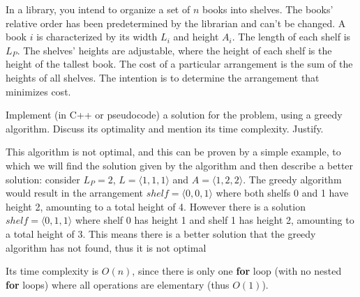 {
\renewcommand{\thechapter}{\arabic{chapter}N}
\setcounter{chapter}{16}

In a library, you intend to organize a set of $n$ books into shelves. The books' relative order has been predetermined by the librarian and can't be changed. A book $i$ is characterized by its width $L_i$ and height $A_i$. The length of each shelf is $L_P$. The shelves' heights are adjustable, where the height of each shelf is the height of the tallest book. The cost of a particular arrangement is the sum of the heights of all shelves. The intention is to determine the arrangement that minimizes cost.

Implement (in C++ or pseudocode) a solution for the problem, using a greedy algorithm. Discuss its optimality and mention its time complexity. Justify.

\ansseparator



This algorithm is not optimal, and this can be proven by a simple example, to which we will find the solution given by the algorithm and then describe a better solution: consider $L_P=2$, $L=\langle 1, 1, 1 \rangle$ and $A = \langle 1, 2, 2 \rangle$. The greedy algorithm would result in the arrangement $shelf=\langle 0, 0, 1 \rangle$ where both shelfs 0 and 1 have height 2, amounting to a total height of 4. However there is a solution $shelf = \langle 0, 1, 1 \rangle$ where shelf 0 has height 1 and shelf 1 has height 2, amounting to a total height of 3. This means there is a better solution that the greedy algorithm has not found, thus it is not optimal

Its time complexity is $O(n)$, since there is only one \textbf{for} loop (with no nested \textbf{for} loops) where all operations are elementary (thus $O(1)$).

}
